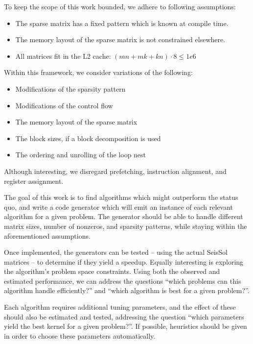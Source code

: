   To keep the scope of this work bounded, we adhere to following assumptions:
  \begin{itemize}
    \item The sparse matrix has a fixed pattern which is known at compile time.
    \item The memory layout of the sparse matrix is not constrained elsewhere.
    \item All matrices fit in the L2 cache: $(mn + mk + kn)\cdot 8 \leq 1e6$
  \end{itemize}

  Within this framework, we consider variations of the following:
  \begin{itemize}
    \item Modifications of the sparsity pattern
    \item Modifications of the control flow
    \item The memory layout of the sparse matrix
    \item The block sizes, if a block decomposition is used
    \item The ordering and unrolling of the loop nest
  \end{itemize}


Although interesting, we disregard prefetching, instruction alignment, and register assignment. 

The goal of this work is to find algorithms which might outperform the status quo, and write a code generator which will emit an instance of each relevant algorithm for a given problem. The generator should be able to handle different matrix sizes, number of nonzeros, and sparsity patterns, while staying within the aforementioned assumptions. 

Once implemented, the generators can be tested -- using the actual SeisSol matrices -- to determine if they yield a speedup. Equally interesting is exploring the algorithm's problem space constraints. Using both the observed and estimated performance, we can address the questions ``which problems can this algorithm handle efficiently?'' and ``which algorithm is best for a given problem?''. 

Each algorithm requires additional tuning parameters, and the effect of these should also be estimated and tested, addressing the question ``which parameters yield the best kernel for a given problem?''. If possible, heuristics should be given in order to choose these parameters automatically.

   
